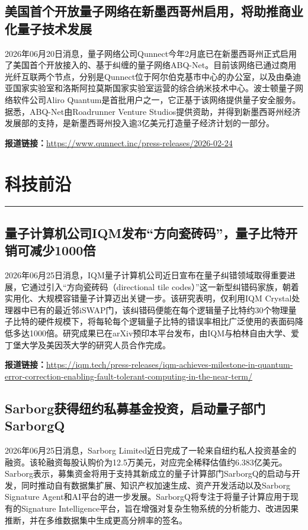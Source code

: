\documentclass[12pt,a4paper]{ctexart}
\begin{document}
\subsection{ 美国首个开放量子网络在新墨西哥州启用，将助推商业化量子技术发展 }

2026年06月20日消息，量子网络公司Qunnect今年2月底已在新墨西哥州正式启用了美国首个开放接入的、基于纠缠的量子网络ABQ-Net。目前该网络已通过商用光纤互联两个节点，分别是Qunnect位于阿尔伯克基市中心的办公室，以及由桑迪亚国家实验室和洛斯阿拉莫斯国家实验室运营的综合纳米技术中心。波士顿量子网络软件公司Aliro Quantum是首批用户之一，它正基于该网络提供量子安全服务。据悉，ABQ-Net由Roadrunner Venture Studios提供资助，并得到新墨西哥州经济发展部的支持，是新墨西哥州投入逾3亿美元打造量子经济计划的一部分。

\noindent\textbf{报道链接：}\url{https://www.qunnect.inc/press-releases/2026-02-24}


\newpage
\section{科技前沿}
\vspace{-0.5em}
\noindent\rule{\linewidth}{1.5pt}

\subsection{ 量子计算机公司IQM发布“方向瓷砖码”，量子比特开销可减少1000倍 }

2026年06月25日消息，IQM量子计算机公司近日宣布在量子纠错领域取得重要进展，它通过引入“方向瓷砖码（directional tile codes）”这一新型纠错码家族，朝着实用化、大规模容错量子计算迈出关键一步。该研究表明，仅利用IQM Crystal处理器中已有的最近邻iSWAP门，该纠错码便能在每个逻辑量子比特约30个物理量子比特的硬件规模下，将每轮每个逻辑量子比特的错误率相比广泛使用的表面码降低多达1000倍。研究成果已在arXiv预印本平台发布，由IQM与柏林自由大学、爱丁堡大学及美因茨大学的研究人员合作完成。

\noindent\textbf{报道链接：}\url{https://iqm.tech/press-releases/iqm-achieves-milestone-in-quantum-error-correction-enabling-fault-tolerant-computing-in-the-near-term/}

\subsection{ Sarborg获得纽约私募基金投资，启动量子部门SarborgQ }

2026年06月25日消息，Sarborg Limited近日完成了一轮来自纽约私人投资基金的融资。该轮融资每股认购价为12.5万美元，对应完全稀释估值约6.383亿美元。Sarborg表示，募集资金将用于支持其新成立的量子计算部门SarborgQ的启动与开发，同时推动自有数据集扩展、知识产权加速生成、资产开发活动以及Sarborg Signature Agent和AI平台的进一步发展。SarborgQ将专注于将量子计算应用于现有的Signature Intelligence平台，旨在增强对复杂生物系统的分析能力、改进因果推断，并在多维数据集中生成更高分辨率的签名。
\end{document}
